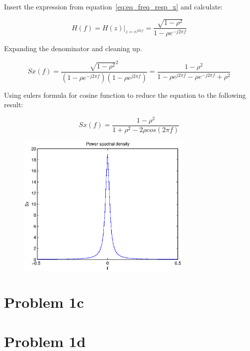	Insert the expression from equation~\ref{eq:eq_freq_resp_x} and calculate:
	
	\begin{equation*}
		H(f)=H(z)|_{z=e^{j2\pi f}}=\frac{\sqrt{1-\rho ^2}}{1-\rho e^{-j2\pi f}}
	\end{equation*}
	
	Expanding the denominator and cleaning up.
	
	\begin{equation*}
		Sx(f)=\frac{\sqrt{1-\rho ^2}^2}{(1-\rho e^{-j2\pi f})(1-\rho e^{j2\pi f})}=\frac{1-\rho ^2}{1-\rho e^{j2\pi f}-\rho e^{-j2\pi f}+\rho ^2}
	\end{equation*}
	
	Using eulers formula for cosine function to reduce the equation to the following result:
	
	\begin{equation}
		Sx(f)=\frac{1-\rho ^2}{1+\rho ^2-2\rho cos(2\pi f)}
		\label{eq:eq_Spectral_Density_X}
	\end{equation}
	
	
	
	\begin{figure}[H]
	  \centering
	  \includegraphics[width=0.75\textwidth]{img/Oppgave1b}
	\end{figure}
  
  \section{Problem 1c}
  
	
  
  \section{Problem 1d}
  
